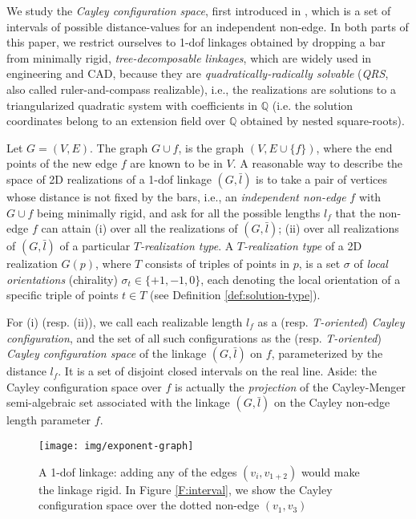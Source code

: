 \documentclass[secthm,amsthm,english]{article}
\theoremstyle{definition}
\theoremstyle{remark}
\begin{document}
\medskip


We study the \emph{Cayley configuration space}, first introduced in \cite{bib:GaoSi05,bib:GaoSitharam08a},
which is a set of intervals of possible distance-values for an independent non-edge. 
In both parts of this paper, we restrict ourselves to 1-dof linkages 
obtained by dropping a bar from minimally rigid, \emph{tree-decomposable linkages},
which are widely used in engineering and CAD, 
because they are \emph{quadratically-radically solvable} (\emph{QRS}, also called ruler-and-compass realizable),
i.e., the realizations are solutions to a
triangularized quadratic system with coefficients in $\mathbb{Q}$
(i.e. the solution coordinates belong to an extension field over
$\mathbb{Q}$ obtained by nested square-roots). 




Let $G  = (V,E)$. The graph $G\cup f$, is the graph $(V,E\cup\{f\})$, 
where the end
points of the new edge $f$ are known to be in $V$.
A reasonable way to describe the space of 2D realizations of a 1-dof
linkage $(G,\bar{l})$ is to take a pair of vertices whose distance is not fixed by the bars,
i.e., an {\em independent non-edge} $f$ with $G\cup f$ being minimally rigid, 
and ask for all the possible lengths $l_f$ that the non-edge $f$ can attain (i) over all the realizations of $(G, \bar{l})$; 
(ii) over all realizations of $(G, \bar{l})$ of a particular \emph{$T$-realization type}. A \emph{$T$-realization type} of a 2D realization $G(p)$,
where $T$ consists of triples of points in $p$, 
is a set $\sigma$  of \emph{local orientations} (chirality) $\sigma_t \in \{+1,-1,0\}$, each denoting the local orientation of a specific 
triple of points $t \in T$ (see Definition \ref{def:solution-type}). 


For (i) (resp. (ii)), we call each realizable length $l_f$ as a (resp. \emph{T-oriented}) \emph{Cayley configuration}, 
and the set of all such configurations as the (resp. \emph{T-oriented}) \emph{Cayley configuration space} of the linkage $(G,\bar{l})$ on $f$, parameterized by the distance $l_f$. 
It is a set of disjoint closed intervals on the real line.
Aside: the Cayley configuration space over $f$ 
is actually the \textsl{projection} of the Cayley-Menger semi-algebraic set \cite{bib:cayley}
associated with the linkage $(G,\bar{l})$ on the Cayley non-edge length parameter $f$. 


\begin{figure}[h]
	
	\begin{centering}
	\texttt{[image: img/exponent-graph]}
	\par\end{centering}
	
	\caption{A 1-dof linkage: adding any of the edges $(v_i,v_{1+2})$ would make the linkage rigid. 
	In Figure \ref{F:interval}, we show the Cayley configuration space over the dotted non-edge $(v_1,v_3)$}

\label{F:intro} 
\end{figure}
\end{document}
